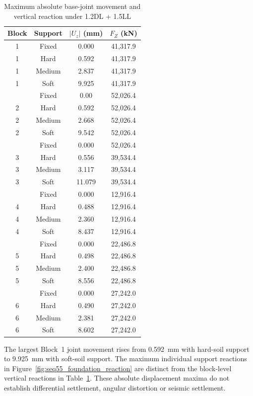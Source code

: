 \begin{table}[htbp]
\fontsize{11}{13}\selectfont\setlength{\tabcolsep}{4pt}
\caption{Maximum absolute base-joint movement and vertical reaction under 1.2DL + 1.5LL}
\label{tab:seq54_foundation}
\centering
\begingroup
\fontsize{11}{13}\selectfont
\renewcommand{\arraystretch}{1.0}
\begin{tabular*}{\linewidth}{@{\extracolsep{\fill}}cccc@{}}
\toprule
Block & Support & $|U_z|$ (mm) & $F_Z$ (kN)\\
\midrule
1 & Fixed & 0.000 & 41,317.9 \\
1 & Hard & 0.592 & 41,317.9 \\
1 & Medium & 2.837 & 41,317.9 \\
1 & Soft & 9.925 & 41,317.9 \\
\addlinespace[2pt]
2 & Fixed & 0.00 & 52,026.4 \\
2 & Hard & 0.592 & 52,026.4 \\
2 & Medium & 2.668 & 52,026.4 \\
2 & Soft & 9.542 & 52,026.4 \\
\addlinespace[2pt]
3 & Fixed & 0.000 & 52,026.4 \\
3 & Hard & 0.556 & 39,534.4 \\
3 & Medium & 3.117 & 39,534.4 \\
3 & Soft & 11.079 & 39,534.4 \\
\addlinespace[2pt]
4 & Fixed & 0.000 & 12,916.4 \\
4 & Hard & 0.488 & 12,916.4 \\
4 & Medium & 2.360 & 12,916.4 \\
4 & Soft & 8.437 & 12,916.4 \\
\addlinespace[2pt]
5 & Fixed & 0.000 & 22,486.8 \\
5 & Hard & 0.498 & 22,486.8 \\
5 & Medium & 2.400 & 22,486.8 \\
5 & Soft & 8.556 & 22,486.8 \\
\addlinespace[2pt]
6 & Fixed & 0.000 & 27,242.0 \\
6 & Hard & 0.490 & 27,242.0 \\
6 & Medium & 2.381 & 27,242.0 \\
6 & Soft & 8.602 & 27,242.0 \\
\bottomrule
\end{tabular*}
\endgroup
\end{table}
\FloatBarrier

The largest Block~1 joint movement rises from 0.592~mm with hard-soil support to 9.925~mm with soft-soil support. The maximum individual support reactions in Figure~\ref{fig:seq55_foundation_reaction} are distinct from the block-level vertical reactions in Table~\ref{tab:seq54_foundation}. These absolute displacement maxima do not establish differential settlement, angular distortion or seismic settlement.

